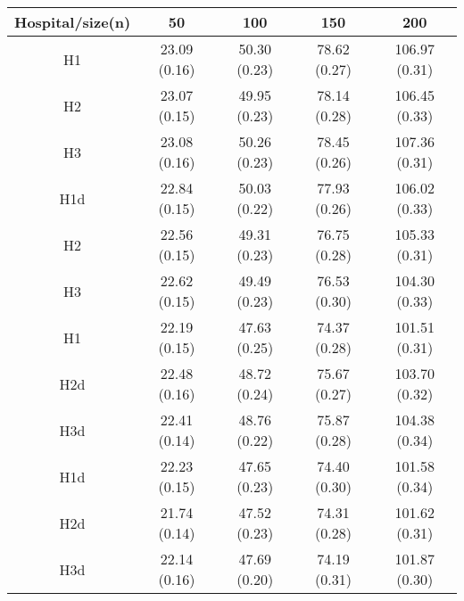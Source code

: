 \begin{center}
\begin{tabular}{c | c | c | c | c}
Hospital/size(n) & 50 & 100 & 150 & 200\\ \hline
H1 & 23.09 (0.16) & 50.30 (0.23) & 78.62 (0.27) & 106.97 (0.31) \\
H2 & 23.07 (0.15) & 49.95 (0.23) & 78.14 (0.28) & 106.45 (0.33) \\
H3 & 23.08 (0.16) & 50.26 (0.23) & 78.45 (0.26) & 107.36 (0.31) \\
H1d & 22.84 (0.15) & 50.03 (0.22) & 77.93 (0.26) & 106.02 (0.33) \\
H2 & 22.56 (0.15) & 49.31 (0.23) & 76.75 (0.28) & 105.33 (0.31) \\
H3 & 22.62 (0.15) & 49.49 (0.23) & 76.53 (0.30) & 104.30 (0.33) \\
H1 & 22.19 (0.15) & 47.63 (0.25) & 74.37 (0.28) & 101.51 (0.31) \\
H2d & 22.48 (0.16) & 48.72 (0.24) & 75.67 (0.27) & 103.70 (0.32) \\
H3d & 22.41 (0.14) & 48.76 (0.22) & 75.87 (0.28) & 104.38 (0.34) \\
H1d & 22.23 (0.15) & 47.65 (0.23) & 74.40 (0.30) & 101.58 (0.34) \\
H2d & 21.74 (0.14) & 47.52 (0.23) & 74.31 (0.28) & 101.62 (0.31) \\
H3d & 22.14 (0.16) & 47.69 (0.20) & 74.19 (0.31) & 101.87 (0.30) \\
\end{tabular}
\end{center}
